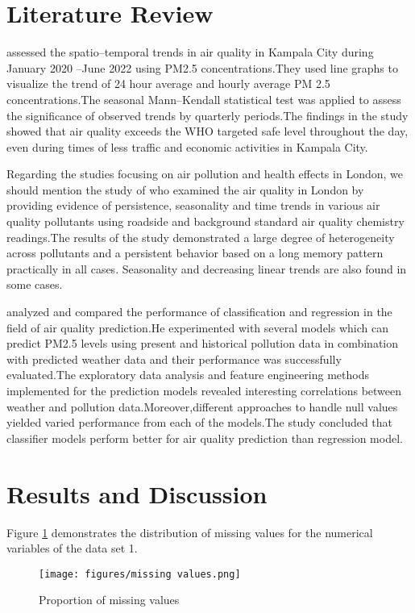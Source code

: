 \documentclass[]{article}
\begin{document}
\section{Literature Review}
\textcite{Ninsiima2023} assessed the spatio–temporal trends in air quality in  Kampala City during January 2020 –June 2022 using PM2.5 concentrations.They used line graphs to visualize the trend of 24 hour average and hourly average PM 2.5 concentrations.The seasonal Mann–Kendall statistical test was applied to assess the significance of observed trends by quarterly periods.The findings in the study showed that air quality exceeds the WHO targeted safe level throughout the day, even during times of less traffic and economic activities in Kampala City.

Regarding the studies focusing on air pollution and health effects in London, we should mention the study of \textcite{GilAlana2020} who examined the air quality in London by providing evidence of persistence, seasonality and time trends in various air quality pollutants using roadside and background standard air quality chemistry readings.The results of the study demonstrated a large degree of heterogeneity across pollutants and a persistent behavior based on a long memory  pattern practically in all cases. Seasonality and decreasing linear trends are  also found in some cases.

\textcite{Sampath2019} analyzed and compared the performance of classification and regression in the field of air quality prediction.He experimented with several models which can predict PM2.5 levels using present and historical pollution data in combination with predicted weather data and their performance was successfully evaluated.The exploratory data analysis and feature engineering methods implemented for the prediction models revealed interesting correlations between weather and pollution data.Moreover,different approaches to handle null values yielded varied performance from each of the models.The study concluded that classifier models perform better for air quality prediction than regression model.

\newpage
\section{Results and Discussion}
Figure \ref{figure 1} demonstrates the distribution of missing values for the numerical variables of the data set 1.
\begin{figure}[H]
	\centering
	\texttt{[image: figures/missing values.png]}	
	\caption{Proportion of missing values}
	\label{figure 1}
\end{figure}
\end{document}

